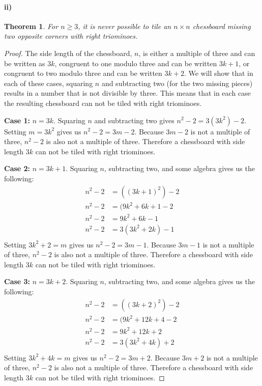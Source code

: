 \documentclass[10pt,letter]{article}
\newtheorem*{thm}{Theorem}
\begin{document}
\paragraph{ii)}
\begin{thm}
  For $n \geq 3$, it is never possible to tile an $n \times n$ chessboard missing two opposite corners with right triominoes.
\end{thm}
\begin{proof}
  The side length of the chessboard, $n$, is either a multiple of three and can be written as $3k$, congruent to one modulo three and can be written $3k + 1$, or congruent to two modulo three and can be written $3k + 2$. We will show that in each of these cases, squaring $n$ and subtracting two (for the two missing pieces) results in a number that is not divisible by three. This means that in each case the resulting chessboard can not be tiled with right triominoes.
  \item \textbf{Case 1:} $n = 3k$. Squaring $n$ and subtracting two gives $n^2-2 = 3(3k^2)-2$. Setting $m = 3k^2$ gives us $n^2 -2 = 3m - 2$. Because $3m-2$ is not a multiple of three, $n^2-2$ is also not a multiple of three. Therefore a chessboard with side length $3k$ can not be tiled with right triominoes.
  \item \textbf{Case 2:} $n = 3k + 1$. Squaring $n$, subtracting two, and some algebra gives us the following:
    \begin{align*}
      n^2-2 &= ((3k+1)^2)-2\\
      n^2-2 &= (9k^2 + 6k + 1-2\\
      n^2-2 &= 9k^2 + 6k - 1\\
      n^2-2 &= 3(3k^2 + 2k) - 1\\
    \end{align*}
    Setting $3k^2 + 2 = m$ gives us $n^2 - 2 = 3m - 1$. Because $3m-1$ is not a multiple of three, $n^2-2$ is also not a multiple of three. Therefore a chessboard with side length $3k$ can not be tiled with right triominoes.
  \item \textbf{Case 3:} $n = 3k + 2$. Squaring $n$, subtracting two, and some algebra gives us the following:
    \begin{align*}
      n^2-2 &= ((3k+2)^2)-2\\
      n^2-2 &= (9k^2 + 12k + 4 - 2\\
      n^2-2 &= 9k^2 + 12k + 2\\
      n^2-2 &= 3(3k^2 + 4k) + 2\\
    \end{align*}
    Setting $3k^2 + 4k = m$ gives us $n^2 - 2 = 3m + 2$. Because $3m+2$ is not a multiple of three, $n^2-2$ is also not a multiple of three. Therefore a chessboard with side length $3k$ can not be tiled with right triominoes.
\end{proof}
      
\end{document}
